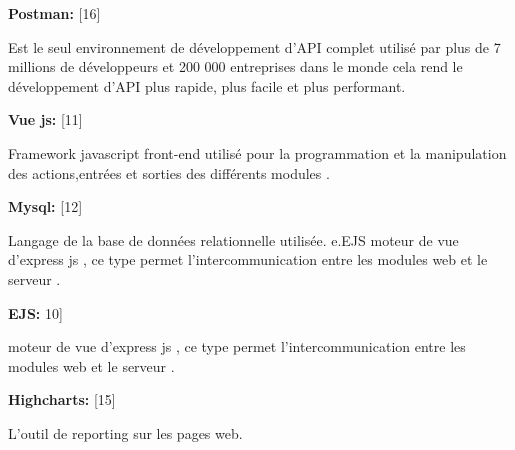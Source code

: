 \textbf{ Postman:} [16]

Est le seul environnement de d\'{e}veloppement d'API complet utilis\'{e} par plus de 7 millions
de d\'{e}veloppeurs et 200 000 entreprises dans le monde
cela rend le d\'{e}veloppement d'API plus rapide,
 plus facile et plus performant.



\textbf{ Vue js:} [11]

Framework javascript front-end utilis\'{e} pour la programmation et la
manipulation des actions,entr\'{e}es et sorties des diff\'{e}rents modules . \newline


\textbf{ Mysql:} [12]

Langage de la base de donn\'{e}es relationnelle utilis\'{e}e.
e.EJS moteur de vue d'express js , ce type permet l'intercommunication entre
les modules web et le serveur . \newline


\textbf{ EJS:} 10]

moteur de vue d'express js , ce type permet l'intercommunication entre
les modules web et le serveur . \newline



\textbf{ Highcharts: }  [15]

L'outil de \guillemotleft{} reporting \guillemotright{} sur les pages web.



























